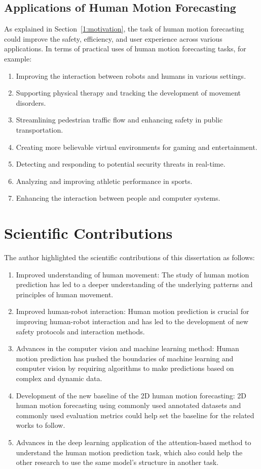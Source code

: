 \subsection{Applications of Human Motion Forecasting}
As explained in Section~\ref{1:motivation}, the task of human motion forecasting could improve the safety, efficiency, and user experience across various applications. In terms of practical uses of human motion forecasting tasks, for example:
\begin{enumerate}
    \item Improving the interaction between robots and humans in various settings.
    \item Supporting physical therapy and tracking the development of movement disorders.
    \item Streamlining pedestrian traffic flow and enhancing safety in public transportation.
    \item Creating more believable virtual environments for gaming and entertainment.
    \item Detecting and responding to potential security threats in real-time.
    \item Analyzing and improving athletic performance in sports.
    \item Enhancing the interaction between people and computer systems.
\end{enumerate}


\section{Scientific Contributions}\label{1:contribution} %
The author highlighted the scientific contributions of this dissertation as follows:
\begin{enumerate}
    \item Improved understanding of human movement: The study of human motion prediction has led to a deeper understanding of the underlying patterns and principles of human movement.
    \item Improved human-robot interaction: Human motion prediction is crucial for improving human-robot interaction and has led to the development of new safety protocols and interaction methods.
    \item Advances in the computer vision and machine learning method: Human motion prediction has pushed the boundaries of machine learning and computer vision by requiring algorithms to make predictions based on complex and dynamic data.
    \item Development of the new baseline of the 2D human motion forecasting: 2D human motion forecasting using commonly used annotated datasets and commonly used evaluation metrics could help set the baseline for the related works to follow.
    \item Advances in the deep learning application of the attention-based method to understand the human motion prediction task, which also could help the other research to use the same model's structure in another task.
\end{enumerate}

